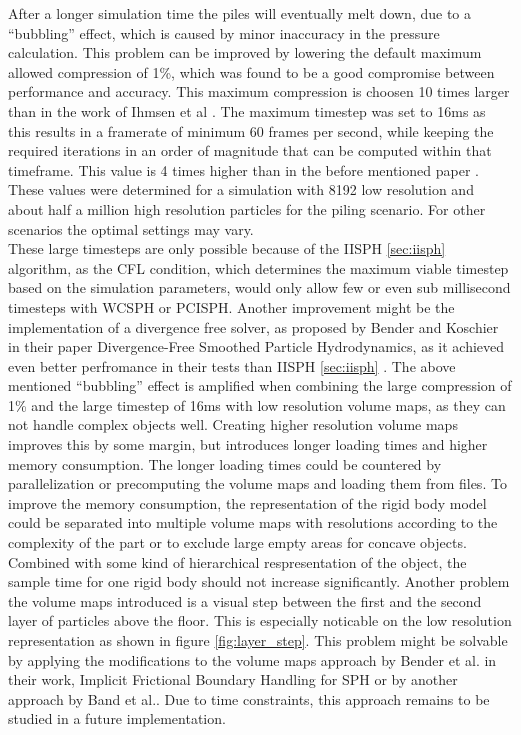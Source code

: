 \documentclass[intern]{cgMA}
\begin{document}
    After a longer simulation time the piles will eventually melt down, due to a \enquote{bubbling} effect, which is caused by minor inaccuracy in the pressure calculation. This problem can be improved by lowering the default maximum allowed compression of 1\%, which was found to be a good compromise between performance and accuracy. This maximum compression is choosen 10 times larger than in the work of Ihmsen et al \cite{6570475}. The maximum timestep was set to 16ms as this results in a framerate of minimum 60 frames per second, while keeping the required iterations in an order of magnitude that can be computed within that timeframe. This value is 4 times higher than in the before mentioned paper \cite{6570475}. These values were determined for a simulation with 8192 low resolution and about half a million high resolution particles for the piling scenario. For other scenarios the optimal settings may vary.\\
    These large timesteps are only possible because of the IISPH \ref{sec:iisph} algorithm, as the CFL condition, which determines the maximum viable timestep based on the simulation parameters, would only allow few or even sub millisecond timesteps with WCSPH or PCISPH. Another improvement might be the implementation of a divergence free solver, as proposed by Bender and Koschier in their paper Divergence-Free Smoothed Particle Hydrodynamics, as it achieved even better perfromance in their tests than IISPH \ref{sec:iisph} \cite{10.1145/2786784.2786796}.
    The above mentioned \enquote{bubbling} effect is amplified when combining the large compression of 1\% and the large timestep of 16ms with low resolution volume maps, as they can not handle complex objects well. Creating higher resolution volume maps improves this by some margin, but introduces longer loading times and higher memory consumption. The longer loading times could be countered by parallelization or precomputing the volume maps and loading them from files.
    To improve the memory consumption, the representation of the rigid body model could be separated into multiple volume maps with resolutions according to the complexity of the part or to exclude large empty areas for concave objects. Combined with some kind of hierarchical respresentation of the object, the sample time for one rigid body should not increase significantly.
    Another problem the volume maps introduced is a visual step between the first and the second layer of particles above the floor. This is especially noticable on the low resolution representation as shown in figure \ref{fig:layer_step}. This problem might be solvable by applying the modifications to the volume maps approach by Bender et al. in their work, Implicit Frictional Boundary Handling for SPH \cite{9123549} or by another approach by Band et al.\cite{10.1145/3180486}. Due to time constraints, this approach remains to be studied in a future implementation.
\end{document}
